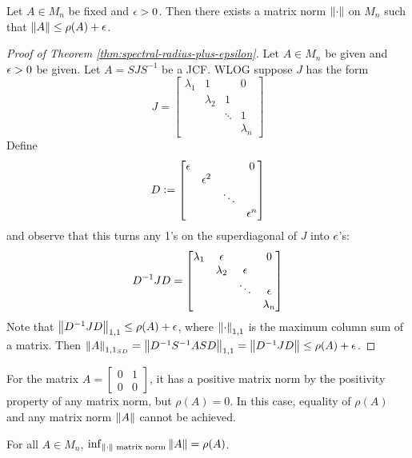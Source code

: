 \begin{theorem}
\label{thm:spectral-radius-plus-epsilon}
Let $A \in M_n$ be fixed and $\epsilon > 0$. Then there exists a matrix norm $\left\lVert\cdot\right\rVert$ on $M_n$ such that $\left\lVert A\right\rVert \le \rho(A) + \epsilon$.
\end{theorem}
\begin{proof}[Proof of Theorem \ref{thm:spectral-radius-plus-epsilon}]
Let $A \in M_n$ be given and $\epsilon > 0$ be given. Let $A = SJS^{-1}$ be a JCF. WLOG suppose $J$ has the form
\[
    J = \begin{bmatrix}
    \lambda_1 & 1 & & 0 \\
    & \lambda_2 & 1 & \\
    & & \ddots & 1\\
    & & & \lambda_n
    \end{bmatrix}
\]
Define
\[
    D \vcentcolon= \begin{bmatrix}
    \epsilon & & & 0 \\
    & \epsilon^2 & & \\
    & & \ddots & \\
    & & & \epsilon^n
    \end{bmatrix}
\]
and observe that this turns any 1's on the superdiagonal of $J$ into $\epsilon$'s:
\[
    D^{-1}JD = \begin{bmatrix}
    \lambda_1 & \epsilon & & 0 \\
    & \lambda_2 & \epsilon & \\
    & & \ddots & \epsilon\\
    & & & \lambda_n
    \end{bmatrix}
\]
Note that $\left\lVert D^{-1}JD\right\rVert_{1,1} \le \rho(A) + \epsilon$, where $\left\lVert\cdot\right\rVert_{1,1}$ is the maximum column sum of a matrix. Then $\left\lVert A\right\rVert_{1,1_{SD}} = \left\lVert D^{-1}S^{-1}ASD\right\rVert_{1,1} = \left\lVert D^{-1}JD\right\rVert \le \rho(A) + \epsilon$.
\end{proof}

\begin{example}
For the matrix $A = \begin{bmatrix}0&1\\0&0\end{bmatrix}$, it has a positive matrix norm by the positivity property of any matrix norm, but $\rho(A) = 0$. In this case, equality of $\rho(A)$ and any matrix norm $\left\lVert A\right\rVert$ cannot be achieved.
\end{example}

\begin{corollary}
\label{cor:spectral-radius-infimum}
For all $A \in M_n$, $\inf_{\left\lVert\cdot\right\rVert \text{ matrix norm}} \left\lVert A\right\rVert = \rho(A)$.
\end{corollary}

